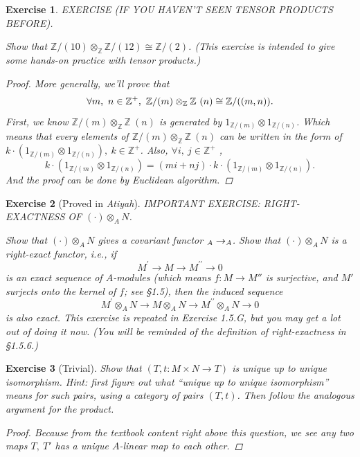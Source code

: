 \documentclass{article}
\theoremstyle{breakstyle}
\newtheorem{exercise}{Exercise}[section]
\let\mod\relax
\DeclareMathOperator{\mod}{Mod}
\let\gcd\relax
\DeclareMathOperator{\gcd}{Gcd}
\begin{document}
\begin{exercise}
EXERCISE (IF YOU HAVEN'T SEEN TENSOR PRODUCTS BEFORE).

Show that $\mathbb{Z}/(10) \otimes_{\mathbb{Z}} \mathbb{Z}/(12) \cong
\mathbb{Z}/(2)$. (This exercise is intended to give some hands-on practice
with tensor products.)

\begin{proof}
	More generally, we'll prove that
	$$
    \forall m,\ n \in \mathbb{Z}^{+},\ \mathbb{Z} / (m)
    \otimes_{\mathbb{Z}}\mathbb{Z} \ (n) \cong \mathbb{Z} / (\gcd(m,n))
	.$$ 
    First, we know $\mathbb{Z} / (m) \otimes_{\mathbb{Z}}\mathbb{Z} \ (n)$ is
    generated by $1_{\mathbb{Z} / (m)} \otimes 1_{\mathbb{Z} / (n)}$. Which means
    that every elements of $\mathbb{Z} / (m) \otimes_{\mathbb{Z}}\mathbb{Z} \
    (n) $ can be written in the form of $k\cdot (1_{\mathbb{Z} / (m)} \otimes
    1_{\mathbb{Z} / (n)}),\ k \in \mathbb{Z}^{+}$. Also, $\forall i,\ j \in
    \mathbb{Z}^{+}$
	,$$
    k\cdot (1_{\mathbb{Z} / (m)} \otimes 1_{\mathbb{Z} / (n)}) = (mi+nj)\cdot
    k\cdot (1_{\mathbb{Z} / (m)} \otimes 1_{\mathbb{Z} / (n)})
	.$$ 
	And the proof can be done by Euclidean algorithm.
\end{proof}

\end{exercise}

\begin{exercise}[Proved in \emph{Atiyah}]
IMPORTANT EXERCISE: RIGHT-EXACTNESS OF $(\cdot)\otimes_{A}N$.

Show that $(\cdot)\otimes_{A}N$ gives a covariant functor
$\mod_{A}\to\mod_{A}$. Show that $(\cdot)\otimes_{A}N$ is a right-exact
functor, i.e., if
$$
M^{\prime} \to M \to M^{\prime\prime} \to 0
$$
is an exact sequence of $A$-modules (which means $f\colon M\to M''$ is
surjective, and $M'$ surjects onto the kernel of $f$; see \S\emph{1.5}),
then the induced sequence
$$
M^{\prime} \otimes_{A} N \to M \otimes_{A} N \to M^{\prime\prime}
\otimes_{A} N \to 0
$$
is also exact. This exercise is repeated in Exercise 1.5.G, but you may get
a lot out of doing it now. (You will be reminded of the definition of
right-exactness in \S\emph{1.5.6}.)
\end{exercise}

\begin{exercise}[Trivial]
Show that $(T, t: M \times N \rightarrow T)$ is unique up to unique
isomorphism. Hint: first figure out what ``unique up to unique isomorphism''
means for such pairs, using a category of pairs $(T, t)$. Then follow the
analogous argument for the product.

\begin{proof}
    Because from the textbook content right above this question, we see any two
    maps $T,\ T'$ has a unique $A$-linear map to each other.
\end{proof}

\end{exercise}
\end{document}
